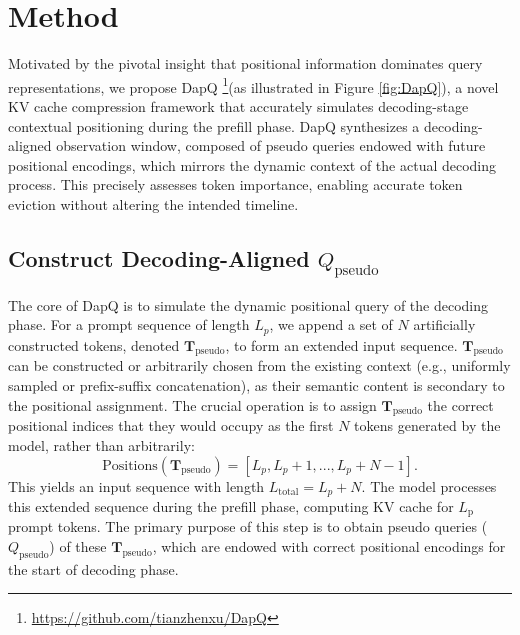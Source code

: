 \section{Method}

Motivated by the pivotal insight that positional information dominates query representations, we propose DapQ \footnote{\url{https://github.com/tianzhenxu/DapQ}}(as illustrated in Figure \ref{fig:DapQ}), a novel KV cache compression framework that accurately simulates decoding-stage contextual positioning during the prefill phase. DapQ synthesizes a decoding-aligned observation window, composed of pseudo queries endowed with future positional encodings, which mirrors the dynamic context of the actual decoding process. This precisely assesses token importance, enabling accurate token eviction without altering the intended timeline.

\subsection{Construct Decoding-Aligned \texorpdfstring{\(Q_{\text{pseudo}}\)}{Q\_pseudo}}
The core of DapQ is to simulate the dynamic positional query of the decoding phase. For a prompt sequence of length \(L_p\), we append a set of \(N\) artificially constructed tokens, denoted \(\mathbf{T}_{\text{pseudo}}\), to form an extended input sequence. \(\mathbf{T}_{\text{pseudo}}\) can be constructed or arbitrarily chosen from the existing context (e.g., uniformly sampled or prefix-suffix concatenation), as their semantic content is secondary to the positional assignment. The crucial operation is to assign \(\mathbf{T}_{\text{pseudo}}\) the correct positional indices that they would occupy as the first \(N\) tokens generated by the model, rather than arbitrarily:
\begin{equation*}
\text{Positions}(\mathbf{T}_{\text{pseudo}}) = [L_p, L_p+1, ..., L_p+N-1].
\end{equation*}
This yields an input sequence with length \(L_{\text{total}} = L_p + N\). The model processes this extended sequence during the prefill phase, computing KV cache for \(L_{\text{p}}\) prompt tokens. The primary purpose of this step is to obtain pseudo queries (\(Q_{\text{pseudo}}\)) of these  \(\mathbf{T}_{\text{pseudo}}\), which are endowed with correct positional encodings for the start of decoding phase.

